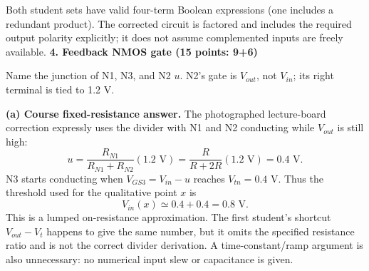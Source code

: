 \documentclass[10pt]{article}
\newcommand{\mos}[4]{\begin{scope}[shift={(#1,#2)}]
\draw (0,.24)--(0,-.24);\draw (0,.20)--(.25,.20)--(.25,.5);
\draw (0,-.20)--(.25,-.20)--(.25,-.5);\draw (-.16,.23)--(-.16,-.23);
\ifnum#4=1\draw (-.26,0) circle (.06);\draw (-.75,0)--(-.32,0);\else\draw (-.75,0)--(-.16,0);\fi
\node[anchor=east,font=\scriptsize] at (-.76,0) {$#3$};\end{scope}}
\newcommand{\ground}[2]{\draw (#1,#2)--(#1,{#2-.12});\draw ({#1-.17},{#2-.12})--({#1+.17},{#2-.12});\draw ({#1-.11},{#2-.20})--({#1+.11},{#2-.20});}
\newcommand{\hm}[4]{\begin{scope}[shift={(#1,#2)}]
\draw(-.24,0)--(.24,0);\draw(-.2,0)--(-.2,-.25)--(-.5,-.25);
\draw(.2,0)--(.2,-.25)--(.5,-.25);\draw(-.23,.16)--(.23,.16);
\ifnum#4=1\draw(0,.26)circle(.06);\draw(0,.32)--(0,.75);\else\draw(0,.16)--(0,.75);\fi
\node[font=\scriptsize,above right]at(.30,.05){$#3$};\end{scope}}
\begin{document}
Both student sets have valid four-term Boolean expressions (one includes a redundant product). The corrected circuit is factored and includes the required output polarity explicitly; it does not assume complemented inputs are freely available.
\newpage
\textbf{4. Feedback NMOS gate (15 points: 9+6)}
\begin{center}\end{center}
Name the junction of N1, N3, and N2 $u$. N2's gate is $V_{out}$, not $V_{in}$; its right terminal is tied to 1.2 V.

\textbf{(a) Course fixed-resistance answer.} The photographed lecture-board correction expressly uses the divider with N1 and N2 conducting while $V_{out}$ is still high:
\[u=\frac{R_{N1}}{R_{N1}+R_{N2}}(1.2\text{ V})=\frac{R}{R+2R}(1.2\text{ V})=0.4\text{ V}.\]
N3 starts conducting when $V_{GS3}=V_{in}-u$ reaches $V_{tn}=0.4$ V. Thus the threshold used for the qualitative point $x$ is
\[\boxed{V_{in}(x)\simeq0.4+0.4=0.8\text{ V}.}\]
This is a lumped on-resistance approximation. The first student's shortcut $V_{out}-V_t$ happens to give the same number, but it omits the specified resistance ratio and is not the correct divider derivation. A time-constant/ramp argument is also unnecessary: no numerical input slew or capacitance is given.
\end{document}
